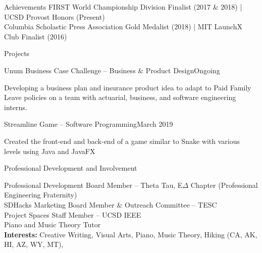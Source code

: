 \documentclass{resume} %
\newcommand{\tab}[1]{\hspace{.2667\textwidth}\rlap{#1}}
\newcommand{\itab}[1]{\hspace{0em}\rlap{#1}}
\begin{document}

\begin{rSection}{\faTrophy{ }}{Achievements} 
FIRST World Championship Division Finalist (2017 \& 2018) | UCSD Provost Honors (Present)
\\Columbia Scholastic Press Association Gold Medalist (2018) | MIT LaunchX Club Finalist (2016)
\end{rSection}

\iffalse
\begin{rSection}{}{Relevant Coursework}
\itab{Algorithm \& Systems Analysis} \tab{}  \tab{Computer Organization \& Systems Programs} 
\\ \itab{Data Structures \& OO Design} \tab{}  \tab{Financial \& Managerial Accounting} 
\\ \itab{Udemy coursework in HTML/CSS for Web Design} \tab{} \tab{Udemy coursework in Python for Financial Analysis}
\end{rSection}
\fi


\begin{rSection}{\faDatabase{ }}{Projects} 

\begin{rSubsection}{}{Unum Business Case Challenge -- Business \& Product Design}{Ongoing}{}{}
\item Developing a business plan and insurance product idea to adapt to Paid Family Leave policies on a team with actuarial, business, and software engineering interns. 
\end{rSubsection}
\begin{rSubsection}{}{Streamline Game -- Software Programming}{March 2019}{}{}
\item Created the front-end and back-end of a game similar to Snake with various levels using Java and JavaFX

\end{rSubsection}
\end{rSection}


\begin{rSection}{\faUsers{ }}{Professional Development and Involvement} 

Professional Development Board Member -- Theta Tau, E$\Delta$ Chapter (Professional Engineering Fraternity)
\\SDHacks Marketing Board Member \& Outreach Committee -- TESC
\\Project Spaces Staff Member -- UCSD IEEE
\\Piano and Music Theory Tutor
\\ \textbf{Interests: }Creative Writing, Visual Arts, Piano, Music Theory, Hiking (CA, AK, HI, AZ, WY, MT),
\end{rSection}


\end{document}
